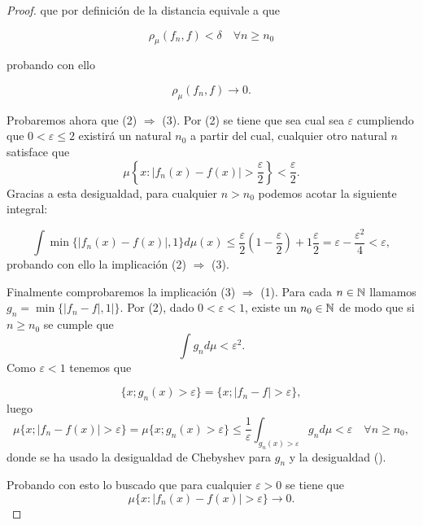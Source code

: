 \begin{proof}
    que por definición de la distancia equivale a que 

    \begin{equation}
        \rho_{\mu}(f_n, f) < \delta \quad \forall n \geq n_0
    \end{equation}

    probando con ello 

    \begin{equation}
        \rho_{\mu}(f_n, f) \longrightarrow 0. 
    \end{equation}

    Probaremos ahora que (2) $\Longrightarrow$ (3).   
    Por (2) se tiene que sea cual sea $\varepsilon$ cumpliendo que 
    $0 < \varepsilon \leq 2$ 
    existirá un natural $n_0$ a partir del cual, cualquier otro natural $n$ 
    satisface que 
    \begin{equation} 
        \mu \left\{  
            x : |f_n(x) - f(x)| > \frac{\varepsilon}{2}  
            \right\}  
        < 
        \frac{\varepsilon}{2}. 
    \end{equation}
    Gracias a esta desigualdad, para cualquier $n > n_0$ podemos acotar la siguiente integral: 

    \begin{equation}
        \int \min \{ |f_n(x) - f(x)|, 1\} d\mu(x) 
        \leq
        \frac{\varepsilon}{2} (1-\frac{\varepsilon}{2}) + 1\frac{\varepsilon}{2} 
         = \varepsilon - \frac{\varepsilon^2}{4} <  \varepsilon,  
    \end{equation}
    probando con ello la implicación (2) $\Longrightarrow$ (3).

    Finalmente comprobaremos la implicación (3) $\Longrightarrow$ (1).
    Para cada $n\in \mathbb{N}$ llamamos $g_n = \min\{|f_n - f|, 1|\}$.
    Por (2), dado $0 < \varepsilon < 1$, existe un $n_0 \in \mathbb{N}$
    de modo que si $n \geq n_0$ se cumple que 
    \begin{equation}\label{eq:definiciones_Básicas_Integral_GN_menor_Epsilon_Cuadrado}
        \int g_n d\mu < \varepsilon^2.
    \end{equation}
    Como $\varepsilon < 1$ tenemos que 

    \begin{equation}
        \{ x; g_n(x) > \varepsilon \}
         = 
         \{ x; |f_n - f| > \varepsilon \},
    \end{equation}
    luego 
    \begin{equation}
        \mu\{ x; |f_n - f(x)| > \varepsilon \}
        = 
        \mu\{ x; g_n(x) > \varepsilon \}
        \leq
        \frac{1}{\varepsilon} 
        \int_{g_n(x) > \varepsilon} g_n d\mu 
        < \varepsilon 
        \quad
        \forall n \geq n_0,
    \end{equation}
    donde se ha usado la desigualdad de Chebyshev para $g_n$ y la desigualdad 
    (). 

Probando con esto lo buscado que  para cualquier  $\varepsilon > 0$ se tiene que 
$$\mu \{  x : |f_n(x) - f(x)| > \varepsilon \} \longrightarrow 0.$$
\end{proof}


